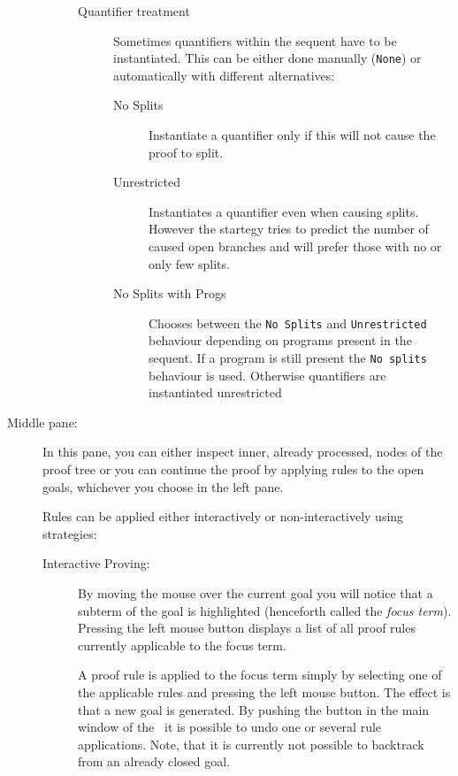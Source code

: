 \begin{description}
\begin{description}
\begin{description}
\begin{description}
   \end{description}
   
   \item[Quantifier treatment] Sometimes quantifiers within the
      sequent have to be instantiated. This can be either done
      manually (\texttt{None}) or automatically with different
      alternatives:
      \begin{description}
        \item[No Splits] Instantiate a quantifier only if
          this will not cause the proof to split.
        \item[Unrestricted] Instantiates a quantifier even
          when causing splits. However the startegy tries to predict
          the number of caused open branches and will prefer those
          with no or only few splits.
        \item[No Splits with Progs] Chooses between the
          \texttt{No Splits} and \texttt{Unrestricted} behaviour
          depending on programs present in the sequent. If a program is
          still present the \texttt{No splits} behaviour is
          used. Otherwise quantifiers are instantiated unrestricted
      \end{description}
    \end{description}   
  \end{description}

\item[Middle pane:] In this pane, you can either inspect inner, already
  processed, nodes of the proof tree or you can continue the proof by
  applying rules to the open goals, whichever you choose in the left
  pane.

  Rules can be applied either interactively or non-interactively
  using strategies:

  \begin{description}
  \item[Interactive Proving:]
    By moving the mouse over the current goal you will notice that a
    subterm of the goal is highlighted (henceforth called the
    \emph{focus term}). Pressing the left mouse button displays a list
    of all proof rules currently applicable to the focus term.
    
    A proof rule is applied to the focus term simply by selecting one of
    the applicable rules and pressing the left mouse button. The effect
    is that a new goal is generated. By pushing the button  in the main window of the \kp\ it is possible to undo one or
    several rule applications. Note, that it is currently not possible
    to backtrack from an already closed goal.
    

\end{description}
\end{description}
